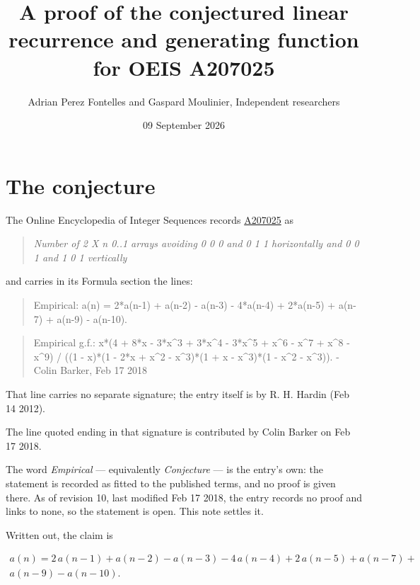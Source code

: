 \documentclass[11pt]{article}
\title{A proof of the conjectured linear recurrence and generating function for OEIS A207025}
\author{Adrian Perez Fontelles and Gaspard Moulinier, Independent researchers}
\date{09 September 2026}
\theoremstyle{definition}
\begin{document}
\maketitle
\section{The conjecture}

The Online Encyclopedia of Integer Sequences records \href{https://oeis.org/A207025}{A207025} as

\begin{quote}\itshape Number of 2 X n 0..1 arrays avoiding 0 0 0 and 0 1 1 horizontally and 0 0 1 and 1 0 1 vertically\end{quote}

and carries in its Formula section the lines:

\begin{quote}\ttfamily Empirical: a(n) = 2*a(n-1) + a(n-2) - a(n-3) - 4*a(n-4) + 2*a(n-5) + a(n-7) + a(n-9) - a(n-10).\end{quote}

\begin{quote}\ttfamily Empirical g.f.: x*(4 + 8*x - 3*x\textasciicircum{}3 + 3*x\textasciicircum{}4 - 3*x\textasciicircum{}5 + x\textasciicircum{}6 - x\textasciicircum{}7 + x\textasciicircum{}8 - x\textasciicircum{}9) / ((1 - x)*(1 - 2*x + x\textasciicircum{}2 - x\textasciicircum{}3)*(1 + x - x\textasciicircum{}3)*(1 - x\textasciicircum{}2 - x\textasciicircum{}3)). - Colin Barker, Feb 17 2018\end{quote}

That line carries no separate signature; the entry itself is by R. H. Hardin (Feb 14 2012).

The line quoted ending in that signature is contributed by Colin Barker on Feb 17 2018.

The word {\itshape Empirical} --- equivalently {\itshape Conjecture} --- is the entry's own: the statement is recorded as fitted to the published terms, and no proof is given there. As of revision 10, last modified Feb 17 2018, the entry records no proof and links to none, so the statement is open. This note settles it.

Written out, the claim is

\begin{multline*} a(n) = 2\,a(n-1) + a(n-2) - a(n-3) - 4\,a(n-4) + 2\,a(n-5) + a(n-7) + \\ a(n-9) - a(n-10). \end{multline*}
\end{document}
